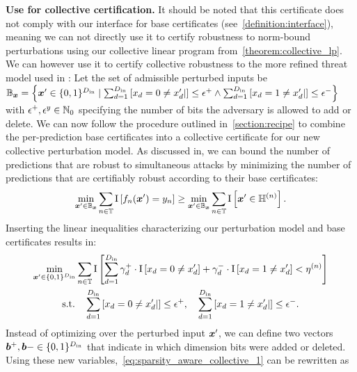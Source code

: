 \textbf{Use for collective certification.} 
It should be noted that this certificate does not comply with our interface for base certificates (see~\cref{definition:interface}),
meaning we can not directly use it to certify robustness to norm-bound perturbations using our collective linear program from~\autoref{theorem:collective_lp}.
We can however use it to certify collective robustness to the more refined threat model used in \citep{Schuchardt2021}:
Let the set of admissible perturbed inputs be
${\mathbb{B}}_{\bm{x}} = \left\{{\bm{x}}' \in \{0,1\}^{D_\mathrm{in}} \mid
\sum_{d=1}^{D_\mathrm{in}} \left[{x}_d = 0 \neq {x}'_d|\right]\leq \epsilon^{+} 
\land
\sum_{d=1}^{D_\mathrm{in}} \left[{x}_d = 1 \neq {x}'_d|\right]\leq \epsilon^{-} 
\right\}$ with $\epsilon^{+}, \epsilon^{y}  \in {\mathbb{N}}_0$ specifying the number of bits the adversary is allowed to add or delete.
We can now follow the procedure outlined in~\autoref{section:recipe} to combine the per-prediction base certificates into a collective certificate for our new collective perturbation model.
As discussed in, we can bound the number of predictions that are robust to simultaneous attacks by minimizing the number of predictions that are certifiably robust according to their base certificates:
\begin{equation}
    \min_{{\bm{x}}' \in {\mathbb{B}}_{\bm{x}}} \sum_{n \in {\mathbb{T}}} \mathrm{I}\left[f_n({\bm{x}}') = {y}_n \right]
    \geq
    \min_{{\bm{x}}' \in {\mathbb{B}}_{\bm{x}}} \sum_{n \in {\mathbb{T}}} \mathrm{I}\left[{\bm{x}}' \in {\mathbb{H}}^{(n)} \right].
\end{equation}
Inserting the linear inequalities characterizing our perturbation model and base certificates results in:
\begin{gather}\label{eq:sparsity_aware_collective_1}
    \min_{{\bm{x}}' \in \{0,1\}^{D_\mathrm{in}}} \sum_{n \in {\mathbb{T}}} \mathrm{I}\left[
    \sum_{d=1}^{D_\mathrm{in}}
        {\gamma}_d^{+} \cdot \mathrm{I}\left[{x}_d = 0 \neq {x}'_d\right]  + 
        {\gamma}_d^{-} \cdot \mathrm{I}\left[{x}_d = 1 \neq {x}'_d\right]  
        < \eta^{(n)}
    \right]
    \\
    \text{s.t.}
    \quad
    \sum_{d=1}^{D_\mathrm{in}} \left[{x}_d = 0 \neq {x}'_d|\right]\leq \epsilon^{+},
\quad
\sum_{d=1}^{D_\mathrm{in}} \left[{x}_d = 1 \neq {x}'_d|\right]\leq \epsilon^{-}.
\end{gather}
Instead of optimizing over the perturbed input ${\bm{x}}'$, we can define two vectors ${\bm{b}}^+, {\bm{b}}- \in \{0,1\}^{D_\mathrm{in}}$ that indicate in which dimension bits were added or deleted. Using these new variables,~\autoref{eq:sparsity_aware_collective_1} can be rewritten as
